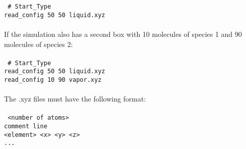 \begin{itemize}
%
\texttt{
\# Start\_Type \\
read\_config 50 50 liquid.xyz \\} \\
%
If the simulation also has a second box with 10 molecules of species 1 and 90 molecules of species 2: \\ \\ 
%
\texttt{
\# Start\_Type \\
read\_config 50 50 liquid.xyz \\
read\_config 10 90 vapor.xyz \\} \\
%
The .xyz files must have the following format:\\ \\
%
\texttt{
 <number of atoms>\\
 comment line\\
 <element> <x> <y> <z>\\
 ...\\
} \\
%


\end{itemize}

